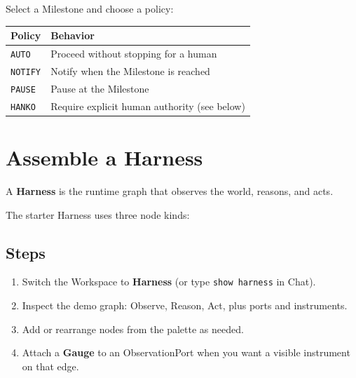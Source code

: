 \documentclass[11pt,a4paper,oneside]{article}
\newcommand{\pathcode}[1]{\texttt{#1}}
\begin{document}
Select a Milestone and choose a policy:

\begin{center}
\begin{tabularx}{\textwidth}{@{}Y L@{}}
\toprule
\textbf{Policy} & \textbf{Behavior} \\
\midrule
\texttt{AUTO} & Proceed without stopping for a human \\
\texttt{NOTIFY} & Notify when the Milestone is reached \\
\texttt{PAUSE} & Pause at the Milestone \\
\texttt{HANKO} & Require explicit human authority (see below) \\
\bottomrule
\end{tabularx}
\end{center}

\section{Assemble a Harness}
\label{sec:harness}

A \textbf{Harness} is the runtime graph that observes the world, reasons, and acts.

The starter Harness uses three node kinds:

\begin{center}
\end{center}

\subsection{Steps}

\begin{enumerate}
  \item Switch the Workspace to \textbf{Harness} (or type \pathcode{show harness} in Chat).
  \item Inspect the demo graph: Observe, Reason, Act, plus ports and instruments.
  \item Add or rearrange nodes from the palette as needed.
  \item Attach a \textbf{Gauge} to an ObservationPort when you want a visible instrument on that edge.
\end{enumerate}
\end{document}
